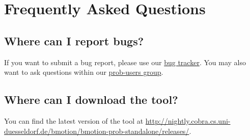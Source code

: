 \chapter{Frequently Asked Questions}
\label{faq}

\section{Where can I report bugs?}
\label{bugs}

If you want to submit a bug report, please use our \href{http://jira.cobra.cs.uni-duesseldorf.de/}{bug tracker}. 
You may also want to ask questions within our \href{https://groups.google.com/d/forum/prob-users}{prob-users group}.

\section{Where can I download the tool?}
\label{download}

You can find the latest version of the tool at \url{http://nightly.cobra.cs.uni-duesseldorf.de/bmotion/bmotion-prob-standalone/releases/}.

